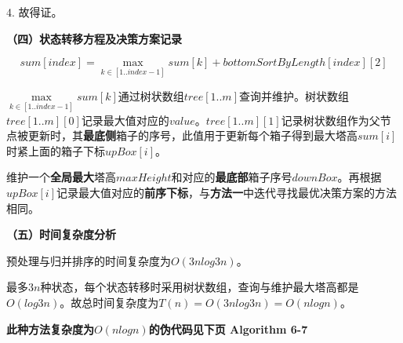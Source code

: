 \documentclass{article}
\begin{document}
4. 故得证。

\textbf{（四）状态转移方程及决策方案记录}

$$sum[index]=\max\limits_{k\in [1..index-1]}{sum[k]}+bottomSortByLength[index][2]$$

$\max\limits_{k\in [1..index-1]}{sum[k]}$通过树状数组$tree[1..m]$查询并维护。树状数组$tree[1..m][0]$记录最大值对应的$value$。$tree[1..m][1]$记录树状数组作为父节点被更新时，其\textbf{最底侧}箱子的序号，此值用于更新每个箱子得到最大塔高$sum[i]$时紧上面的箱子下标$upBox[i]$。


维护一个\textbf{全局最大}塔高$maxHeight$和对应的\textbf{最底部}箱子序号$downBox$。再根据$upBox[i]$记录最大值对应的\textbf{前序下标}，与\textbf{方法一}中迭代寻找最优决策方案的方法相同。

\textbf{（五）时间复杂度分析}

预处理与归并排序的时间复杂度为$O(3nlog3n)$。

最多$3n$种状态，每个状态转移时采用树状数组，查询与维护最大塔高都是$O(log3n)$。故总时间复杂度为$T(n)=O(3nlog3n)=O(nlogn)$。

\textbf{此种方法复杂度为}$O(nlogn)$\textbf{的伪代码见下页 Algorithm 6-7}
\end{document}
